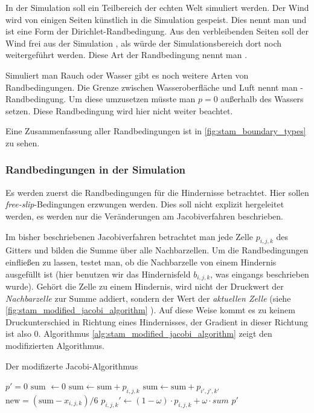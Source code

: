 In der Simulation soll ein Teilbereich der echten Welt simuliert werden. Der
Wind wird von einigen Seiten künstlich in die Simulation gespeist. Dies nennt
man  und ist eine Form der
Dirichlet-Randbedingung. Aus den verbleibenden Seiten soll der Wind frei aus der
Simulation , als würde der Simulationsbereich dort
noch weitergeführt werden. Diese Art der Randbedingung nennt man
.

Simuliert man Rauch oder Wasser gibt es noch weitere Arten von Randbedingungen.
Die Grenze zwischen Wasseroberfläche und Luft nennt man -Randbedingung. Um diese umzusetzen müsste man $p=0$ außerhalb
des Wassers setzen. Diese Randbedingung wird hier nicht weiter beachtet.

Eine Zusammenfassung aller Randbedingungen ist in \autoref{fig:stam_boundary_types} zu sehen.

\subsubsection{Randbedingungen in der Simulation}

Es werden zuerst die Randbedingungen für die Hindernisse betrachtet. Hier sollen
\emph{free-slip}-Bedingungen erzwungen werden. Dies soll nicht explizit
hergeleitet werden, es werden nur die Veränderungen am Jacobiverfahren
beschrieben.

Im bisher beschriebenen Jacobiverfahren betrachtet man jede Zelle $p_{i,j,k}$
des Gitters und bilden die Summe über alle Nachbarzellen. Um die Randbedingungen
einfließen zu lassen, testet man, ob die Nachbarzelle von einem Hindernis
ausgefüllt ist (hier benutzen wir das Hindernisfeld $b_{i,j,k}$, was eingangs
beschrieben wurde). Gehört die Zelle zu einem Hindernis, wird nicht der
Druckwert der \emph{Nachbarzelle} zur Summe addiert, sondern der Wert der
\emph{aktuellen Zelle} (siehe \autoref{fig:stam_modified_jacobi_algorithm}
). Auf
diese Weise kommt es zu keinem Druckunterschied in Richtung eines Hindernisses,
der Gradient in dieser Richtung ist also 0.  Algorithmus
\autoref{alg:stam_modified_jacobi_algorithm} zeigt den modifizierten
Algorithmus.

\begin{algorithm}
\caption{Der modifizerte Jacobi-Algorithmus}
\begin{algorithmic}
	\State $p' = 0$
		\State $\textrm{sum } \gets 0$
				\State $\textrm{sum} \gets \textrm{sum} + p_{i,j,k}$
			\Else
				\State $\textrm{sum} \gets \textrm{sum} + p_{i',j',k'}$
			\EndIf
		\EndFor
		\State $\textrm{new} = (\textrm{sum} - x_{i,j,k})/6$
		\State $p_{i,j,k}' \gets (1-\omega) \cdot p_{i,j,k} + \omega \cdot sum$
	\EndFor
	\State \Return $p'$
\EndFunction
\end{algorithmic}
\label{alg:stam_modified_jacobi_algorithm}
\end{algorithm}

